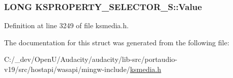 \subsubsection[{\texorpdfstring{Value}{Value}}]{\setlength{\rightskip}{0pt plus 5cm}L\+O\+NG K\+S\+P\+R\+O\+P\+E\+R\+T\+Y\+\_\+\+S\+E\+L\+E\+C\+T\+O\+R\+\_\+\+S\+::\+Value}\hypertarget{struct_k_s_p_r_o_p_e_r_t_y___s_e_l_e_c_t_o_r___s_a38456d9c35941848f0a238b8863c00f3}{}\label{struct_k_s_p_r_o_p_e_r_t_y___s_e_l_e_c_t_o_r___s_a38456d9c35941848f0a238b8863c00f3}


Definition at line 3249 of file ksmedia.\+h.



The documentation for this struct was generated from the following file\+:\begin{DoxyCompactItemize}
\item 
C\+:/\+\_\+dev/\+Open\+U/\+Audacity/audacity/lib-\/src/portaudio-\/v19/src/hostapi/wasapi/mingw-\/include/\hyperlink{ksmedia_8h}{ksmedia.\+h}\end{DoxyCompactItemize}
